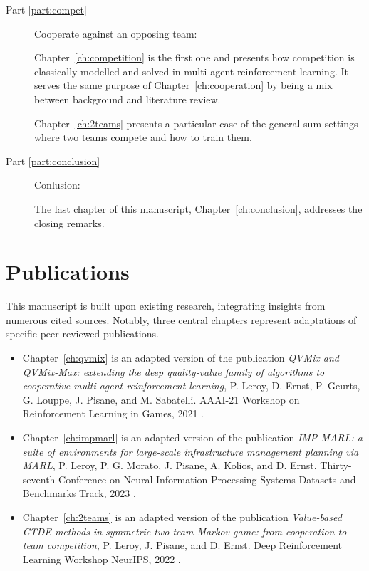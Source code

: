 \begin{description}
    \item [Part \ref{part:compet}]  Cooperate against an opposing team:
    
    Chapter~\ref{ch:competition} is the first one and presents how competition is classically modelled and solved in multi-agent reinforcement learning.
    It serves the same purpose of Chapter~\ref{ch:cooperation} by being a mix between background and literature review.
    
    Chapter~\ref{ch:2teams} presents a particular case of the general-sum settings where two teams compete and how to train them.

    \item [Part \ref{part:conclusion}] Conlusion:
    
    The last chapter of this manuscript, Chapter~\ref{ch:conclusion}, addresses the closing remarks.
\end{description}

\section{Publications}
\label{sec:ch1_publications}

This manuscript is built upon existing research, integrating insights from numerous cited sources.
Notably, three central chapters represent adaptations of specific peer-reviewed publications.

\begin{itemize}
\item Chapter~\ref{ch:qvmix} is an adapted version of the publication \textit{QVMix and QVMix-Max: extending the deep quality-value family of algorithms to cooperative multi-agent reinforcement learning}, P. Leroy, D. Ernst, P. Geurts, G. Louppe, J. Pisane, and M. Sabatelli. AAAI-21 Workshop on Reinforcement Learning in Games, 2021 \citep{leroy2020qvmix}.

\item Chapter~\ref{ch:impmarl} is an adapted version of the publication \textit{IMP-MARL: a suite of environments for large-scale infrastructure management planning via MARL}, P. Leroy, P. G. Morato, J. Pisane, A. Kolios, and D. Ernst. Thirty-seventh Conference on Neural Information Processing Systems Datasets and Benchmarks Track, 2023 \citep{leroy2023impmarl}.

\item Chapter~\ref{ch:2teams} is an adapted version of the publication \textit{Value-based CTDE methods in symmetric two-team Markov game: from cooperation to team competition}, P. Leroy, J. Pisane, and D. Ernst. Deep Reinforcement Learning Workshop NeurIPS, 2022 \citep{leroy2022twoteam}.
\end{itemize}


